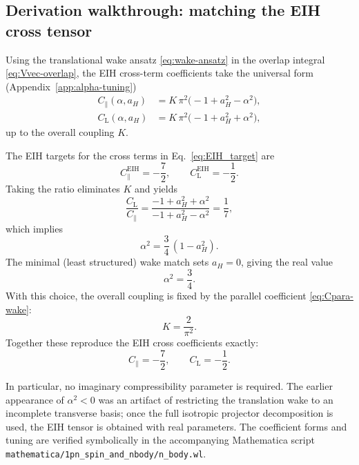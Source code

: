 \documentclass[11pt]{article}
\begin{document}
\subsection{Derivation walkthrough: matching the EIH cross tensor}
\label{subsec:nbody-derivation}

Using the translational wake ansatz \eqref{eq:wake-ansatz} in the overlap
integral \eqref{eq:Vvec-overlap}, the EIH cross-term coefficients take the
universal form (Appendix~\ref{app:alpha-tuning})
\begin{align}
  C_\parallel(\alpha,a_H) &= K\,\pi^2\bigl(-1 + a_H^2 - \alpha^2\bigr),
  \label{eq:Cpara-wake}
  \\
  C_{\text{L}}(\alpha,a_H) &= K\,\pi^2\bigl(-1 + a_H^2 + \alpha^2\bigr),
  \label{eq:CL-wake}
\end{align}
up to the overall coupling $K$.

The EIH targets for the cross terms in Eq.~\eqref{eq:EIH_target} are
\begin{equation}
  C_\parallel^{\text{EIH}}=-\frac{7}{2},
  \qquad
  C_{\text{L}}^{\text{EIH}}=-\frac{1}{2}.
\end{equation}
Taking the ratio eliminates $K$ and yields
\begin{equation}
  \frac{C_{\text{L}}}{C_\parallel}
  =
  \frac{-1 + a_H^2 + \alpha^2}{-1 + a_H^2 - \alpha^2}
  =
  \frac{1}{7},
\end{equation}
which implies
\begin{equation}
  \alpha^2=\frac{3}{4}\,(1-a_H^2).
\end{equation}
The minimal (least structured) wake match sets $a_H=0$, giving the real value
\begin{equation}
  \alpha^2=\frac{3}{4}.
  \label{eq:alpha-squared}
\end{equation}
With this choice, the overall coupling is fixed by the parallel coefficient
\eqref{eq:Cpara-wake}:
\begin{equation}
  K=\frac{2}{\pi^2}.
  \label{eq:K-wake}
\end{equation}
Together these reproduce the EIH cross coefficients exactly:
\begin{equation}
  C_\parallel=-\frac{7}{2},
  \qquad
  C_{\text{L}}=-\frac{1}{2}.
\end{equation}

In particular, no imaginary compressibility parameter is required.
The earlier appearance of $\alpha^2<0$ was an artifact of restricting the
translation wake to an incomplete transverse basis; once the full isotropic
projector decomposition is used, the EIH tensor is obtained with real
parameters.
The coefficient forms and tuning are verified symbolically in the accompanying
Mathematica script \texttt{mathematica/1pn\_spin\_and\_nbody/n\_body.wl}.
\end{document}
